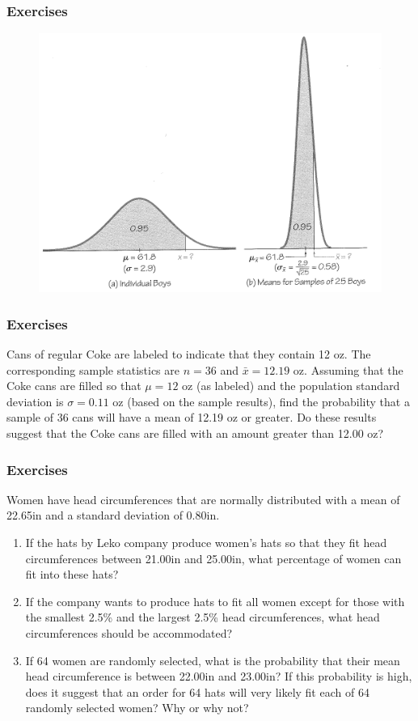 \documentclass[xcolor=dvipsnames]{beamer}
\begin{document}
\begin{frame}
  \frametitle{Exercises} 
\begin{figure}[h]
\includegraphics[scale=.75]{./diagrams/triola-284.png}
\end{figure}
\end{frame}

\begin{frame}
  \frametitle{Exercises} 
  {\ubung} Cans of regular Coke are labeled to
  indicate that they contain 12 oz. The corresponding
  sample statistics are $n=36$ and $\bar{x}=12.19$ oz. Assuming that the
  Coke cans are filled so that $\mu=12$ oz (as labeled) and the
  population standard deviation is $\sigma=0.11$ oz (based on the sample
  results), find the probability that a sample of 36 cans will have a
  mean of 12.19 oz or greater. Do these results suggest that the Coke
  cans are filled with an amount greater than 12.00 oz?
\end{frame}

\begin{frame}
  \frametitle{Exercises}
  {\ubung} Women have head circumferences that are normally
  distributed with a mean of 22.65in and a standard deviation of
  0.80in. 
  \begin{enumerate}
  \item If the hats by Leko company produce women's hats so that
    they fit head circumferences between 21.00in and 25.00in, what
    percentage of women can fit into these hats?
  \item If the company wants to produce hats to fit all women
    except for those with the smallest 2.5\% and the largest 2.5\%
    head circumferences, what head circumferences should be
    accommodated?
  \item If 64 women are randomly selected, what is the probability
    that their mean head circumference is between 22.00in and 23.00in?
    If this probability is high, does it suggest that an order for 64
    hats will very likely fit each of 64 randomly selected women? Why
    or why not?
  \end{enumerate}
\end{frame}
\end{document}
